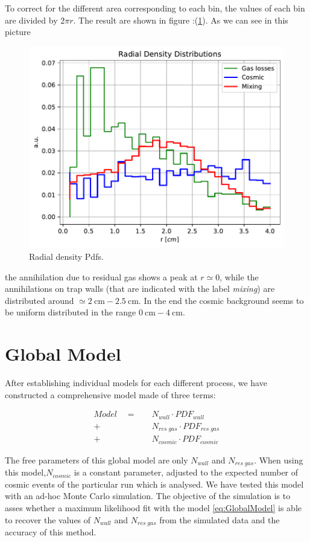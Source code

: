 \documentclass[11pt,a4paper,twocolumn]{article}
\begin{document}
To correct for the different area corresponding to each bin, the values of each bin are divided by $ 2 \pi r$. The result are shown in figure :(\ref{fig:RadialDensity}). As we can see in this picture

\begin{figure}[!hbtp]
\centering
\includegraphics[width = .5\textwidth]{../PlotMLEfit/RadialDensity.pdf}
\caption{Radial density Pdfs.}
\label{fig:RadialDensity}
\end{figure}

the annihilation due to residual gas shows a peak at $r \simeq 0$, while the annihilations on trap walls (that are indicated with the label \textit{mixing}) are distributed around $\simeq \SI{2}{ \centi \meter} - \SI{2.5}{\centi \meter}$. In the end the cosmic background seems to be uniform distributed in the range $\SI{0}{\centi \meter} - \SI{4}{\centi \meter}$.
\section*{Global Model}

After establishing individual models for each different process, we have constructed a comprehensive model made of three terms:

\begin{equation} \label{eq:GlobalModel}
\begin{split}
Model \quad = \quad &N_{wall} \cdot PDF_{wall} \\
	+ &N_{res \; gas} \cdot PDF_{res \; gas}\\ 
	+ &N_{cosmic} \cdot PDF_{cosmic}
\end{split} 
\end{equation} 

The free parameters of this global model are only $N_{wall}$ and $N_{res \; gas}$. When using this model,$N_{cosmic}$ is a constant parameter, adjusted to the expected number of cosmic events of the particular run which is analysed.
We have tested this model with an ad-hoc Monte Carlo simulation. The objective of the simulation is to asses whether a maximum likelihood fit with the model \ref{eq:GlobalModel} is able to recover the values of $N_{wall}$ and $N_{res \; gas}$ from the simulated data and the accuracy of this method.
\appendix
\end{document}
